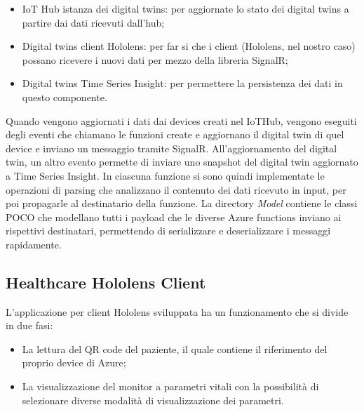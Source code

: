\begin{itemize}
    \item IoT Hub \to \> istanza dei digital twins: per aggiornate lo stato dei digital twins a partire dai dati ricevuti dall'hub;
    
    \item Digital twins \to \> client Hololens: per far si che i client (Hololens, nel nostro caso) possano ricevere i nuovi dati per mezzo della libreria SignalR;
    
    \item Digital twins \to \> Time Series Insight: per permettere la persistenza dei dati in questo componente.
\end{itemize}

Quando vengono aggiornati i dati dai devices creati nel IoTHub, vengono eseguiti degli eventi che chiamano le funzioni create e aggiornano il digital twin di quel device e inviano un messaggio tramite SignalR. All'aggiornamento del digital twin, un altro evento permette di inviare uno snapshot del digital twin aggiornato a Time Series Insight.
In ciascuna funzione si sono quindi implementate le operazioni di parsing che analizzano il contenuto dei dati ricevuto in input, per poi propagarle al destinatario della funzione. \newline \newline La directory \textit{Model} contiene le classi POCO che modellano tutti i payload che le diverse Azure functions inviano ai rispettivi destinatari, permettendo di serializzare e deserializzare i messaggi rapidamente.

\subsection{Healthcare Hololens Client}

L'applicazione per client Hololens sviluppata ha un funzionamento che si divide in due fasi:
\begin{itemize}
    \item La lettura del QR code del paziente, il quale contiene il riferimento del proprio device di Azure;
    \item La visualizzazione del monitor a parametri vitali con la possibilità di selezionare diverse modalità di visualizzazione dei parametri.
\end{itemize}


